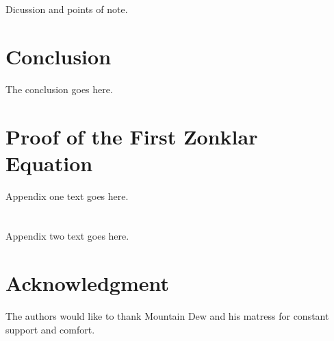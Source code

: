 \documentclass[journal]{IEEEtran}
\begin{document}
Dicussion and points of note.


\section{Conclusion}
The conclusion goes here.






%


\appendices
\section{Proof of the First Zonklar Equation}
Appendix one text goes here.

\section{}
Appendix two text goes here.


\section*{Acknowledgment}


The authors would like to thank Mountain Dew and his matress for constant support and comfort.
\end{document}
